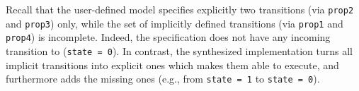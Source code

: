 
Recall that the user-defined model specifies explicitly two transitions (via \texttt{prop2} and \texttt{prop3}) only, while the set of implicitly defined transitions (via \texttt{prop1} and \texttt{prop4}) is incomplete.
Indeed, the specification does not have any incoming transition to (\texttt{state = 0}).
In contrast, the synthesized implementation turns all implicit transitions into explicit ones which makes them able to execute, and furthermore adds the missing ones (e.g., from \texttt{state = 1} to \texttt{state = 0}).



